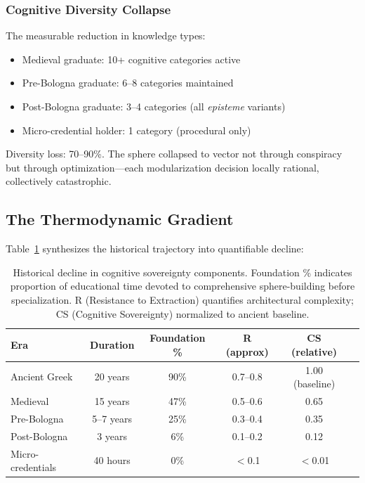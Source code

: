 \subsubsection{Cognitive Diversity Collapse}

The measurable reduction in knowledge types:

\begin{itemize}
    \item Medieval graduate: 10+ cognitive categories active
    \item Pre-Bologna graduate: 6--8 categories maintained
    \item Post-Bologna graduate: 3--4 categories (all \textit{episteme} variants)
    \item Micro-credential holder: 1 category (procedural only)
\end{itemize}

Diversity loss: 70--90\%. The sphere collapsed to vector not through conspiracy but through optimization---each modularization decision locally rational, collectively catastrophic.

\subsection{The Thermodynamic Gradient}

Table~\ref{tab:thermodynamic-gradient} synthesizes the historical trajectory into quantifiable decline:

\begin{table}[htbp]
\centering
\begin{tabular}{lccccc}
\toprule
\textbf{Era} & \textbf{Duration} & \textbf{Foundation \%} & \textbf{R (approx)} & \textbf{CS (relative)} \\
\midrule
Ancient Greek & 20 years & 90\% & 0.7--0.8 & 1.00 (baseline) \\
Medieval & 15 years & 47\% & 0.5--0.6 & 0.65 \\
Pre-Bologna & 5--7 years & 25\% & 0.3--0.4 & 0.35 \\
Post-Bologna & 3 years & 6\% & 0.1--0.2 & 0.12 \\
Micro-credentials & 40 hours & 0\% & $<$0.1 & $<$0.01 \\
\bottomrule
\end{tabular}
\caption{Historical decline in cognitive sovereignty components. Foundation \% indicates proportion of educational time devoted to comprehensive sphere-building before specialization. R (Resistance to Extraction) quantifies architectural complexity; CS (Cognitive Sovereignty) normalized to ancient baseline.}
\label{tab:thermodynamic-gradient}
\end{table}

